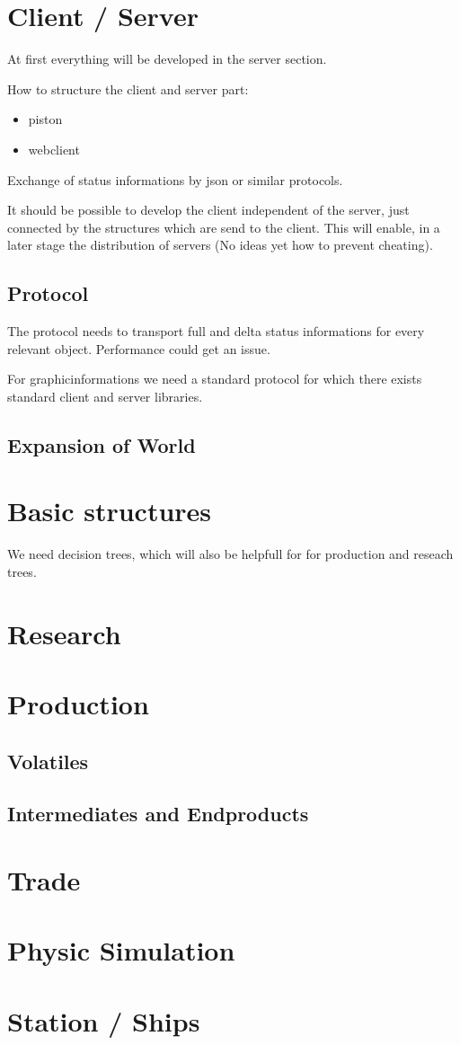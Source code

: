 \section{Client / Server}
At first everything will be developed in the server section. 

How to structure the client and server part:
\begin{itemize}
 \item piston 
 \item webclient
\end{itemize}
Exchange of status informations by json or similar protocols.

It should be possible to develop the client independent of the server, just connected
by the structures which are send to the client. This will enable, in a later stage
the distribution of servers (No ideas yet how to prevent cheating).

\subsection{Protocol}

The protocol needs to transport full and delta status informations for every relevant object. 
Performance could get an issue.

For graphicinformations we need a standard protocol for which there exists standard client
and server libraries.

\subsection{Expansion of World}

\section{Basic structures}
We need decision trees, which will also be helpfull for for production and reseach trees.

\section{Research}

\section{Production}

\subsection{Volatiles}

\subsection{Intermediates and Endproducts}

\section{Trade}

\section{Physic Simulation}

\section{Station / Ships}